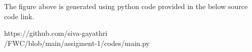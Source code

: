 \documentclass[a4paper,10pt]{report}
\begin{document}
\begin{multicols}{2}
\raggedright\large{The figure above is generated using python code provided in the below source code link.}\vspace{2mm}\\
\begin{mdframed}
\raggedright\large{https://github.com/siva-gayathri \\ /FWC/blob/main/assigment-1/codes/main.py}
\end{mdframed}


\end{multicols}
\end{document}
